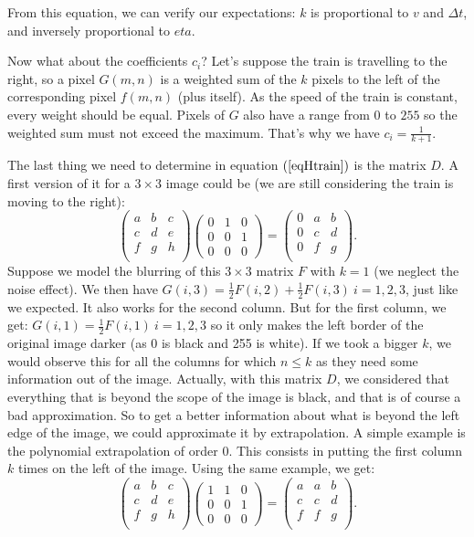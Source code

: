From this equation, we can verify our expectations: $k$ is proportional to $v$ and $\Delta t$, and inversely proportional to $eta$.

Now what about the coefficients $c_i$? Let's suppose the train is travelling to the right, so a pixel $G(m,n)$ is a weighted sum of the $k$ pixels to the left of the corresponding pixel $f(m,n)$ (plus itself). As the speed of the train is constant, every weight should be equal. Pixels of $G$ also have a range from $0$ to $255$ so the weighted sum must not exceed the maximum. That's why we have $c_i=\frac{1}{k+1}$.

The last thing we need to determine in  equation $(\ref{eqHtrain})$ is the matrix $D$. A first version of it for a $3 \times 3$ image could be (we are still considering the train is moving to the right):
$$
\begin{pmatrix}
a & b & c \\
c & d & e \\
f & g & h \\
\end{pmatrix}
\begin{pmatrix}
0 & 1 & 0 \\
0 & 0 & 1 \\
0 & 0 & 0
\end{pmatrix}
=
\begin{pmatrix}
0 & a & b \\
0 & c & d \\
0 & f & g \\
\end{pmatrix}.
$$
Suppose we model the blurring of this $3 \times 3$ matrix $F$ with $k=1$ (we neglect the noise effect). We then have $G(i,3) = \frac{1}{2} F(i,2) + \frac{1}{2} F(i,3)~i=1,2,3$, just like we expected. It also works for the second column. But for the first column, we get: $G(i,1) = \frac{1}{2} F(i,1)~i=1,2,3$ so it only makes the left border of the original image darker (as 0 is black and 255 is white). If we took a bigger $k$, we would observe this for all the columns for which $n \leq k$ as they need some information out of the image. Actually, with this matrix $D$, we considered that everything that is beyond the scope of the image is black, and that is of course a bad approximation. So to get a better information about what is beyond the left edge of the image, we could approximate it by extrapolation. A simple example is the polynomial extrapolation of order 0. This consists in putting the first column $k$ times on the left of the image. Using the same example, we get:
$$
\begin{pmatrix}
a & b & c \\
c & d & e \\
f & g & h \\
\end{pmatrix}
\begin{pmatrix}
1 & 1 & 0 \\
0 & 0 & 1 \\
0 & 0 & 0
\end{pmatrix}
=
\begin{pmatrix}
a & a & b \\
c & c & d \\
f & f & g \\
\end{pmatrix}.
$$

